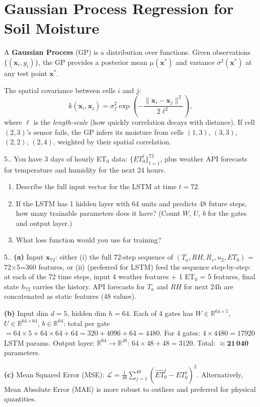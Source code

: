 \documentclass[12pt,a4paper,openany]{book}
\newcounter{exoctr}[chapter]
\renewcommand{\theexoctr}{\thechapter.\arabic{exoctr}}
\newcommand{\R}{\mathbb{R}}
\newcommand{\bx}{\bm{x}}
\begin{document}
\section{Gaussian Process Regression for Soil Moisture}

A \textbf{Gaussian Process} (GP) is a distribution over functions. Given observations $\{(\bx_i,y_i)\}$, the GP provides a posterior mean $\mu(\bx^*)$ and variance $\sigma^2(\bx^*)$ at any test point $\bx^*$.

The spatial covariance between cells $i$ and $j$:
\begin{equation}
  k(\bx_i,\bx_j) = \sigma_f^2\exp\!\left(-\frac{\|\bx_i-\bx_j\|^2}{2\ell^2}\right),
\end{equation}
where $\ell$ is the \textit{length-scale} (how quickly correlation decays with distance). If cell $(2,3)$'s sensor fails, the GP infers its moisture from cells $(1,3)$, $(3,3)$, $(2,2)$, $(2,4)$, weighted by their spatial correlation.

\begin{exobox}{5.\theexoctr}
You have 3 days of hourly ET$_0$ data: $\{ET_0^t\}_{t=1}^{72}$, plus weather API forecasts for temperature and humidity for the next 24 hours.
\begin{enumerate}[label=(\alph*)]
  \item Describe the full input vector for the LSTM at time $t=72$.
  \item If the LSTM has 1 hidden layer with 64 units and predicts 48 future steps, how many trainable parameters does it have? (Count $W$, $U$, $b$ for the gates and output layer.)
  \item What loss function would you use for training?
\end{enumerate}
\end{exobox}

\begin{solbox}{5.\theexoctr}
\textbf{(a)} Input $\bx_{72}$: either (i) the full 72-step sequence of $(T_a,RH,R_s,u_2,ET_0)$ = 72$\times$5=360 features, or (ii) (preferred for LSTM) feed the sequence step-by-step: at each of the 72 time steps, input 4 weather features + 1 ET$_0$ = 5 features, final state $h_{72}$ carries the history. API forecasts for $T_a$ and $RH$ for next 24h are concatenated as static features (48 values).

\textbf{(b)} Input dim $d=5$, hidden dim $h=64$. Each of 4 gates has $W\in\R^{64\times5}$, $U\in\R^{64\times64}$, $b\in\R^{64}$: total per gate $=64\times5+64\times64+64=320+4096+64=4480$. For 4 gates: $4\times4480=17920$ LSTM params. Output layer: $\R^{64}\to\R^{48}$: $64\times48+48=3120$. Total: $\approx\mathbf{21\,040}$ parameters.

\textbf{(c)} Mean Squared Error (MSE): $\mathcal{L}=\frac{1}{48}\sum_{j=1}^{48}(\hat{ET}_0^j-ET_0^j)^2$. Alternatively, Mean Absolute Error (MAE) is more robust to outliers and preferred for physical quantities.
\end{solbox}
\end{document}
